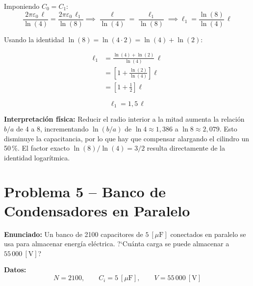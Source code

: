\documentclass[12pt,letterpaper]{article}
\begin{document}
Imponiendo $C_0 = C_1$:
\[
    \frac{2\pi\varepsilon_0\,\ell}{\ln(4)} = \frac{2\pi\varepsilon_0\,\ell_1}{\ln(8)}
    \implies
    \frac{\ell}{\ln(4)} = \frac{\ell_1}{\ln(8)}
    \implies
    \ell_1 = \frac{\ln(8)}{\ln(4)}\,\ell
\]

Usando la identidad $\ln(8) = \ln(4\cdot 2) = \ln(4) + \ln(2)$:

\begin{align*}
    \ell_1 &= \frac{\ln(4) + \ln(2)}{\ln(4)}\,\ell\\[6pt]
           &= \left[1 + \frac{\ln(2)}{\ln(4)}\right]\ell\\[6pt]
           &= \left[1 + \frac{1}{2}\right]\ell
\end{align*}

\[
    \boxed{\ell_1 = 1{,}5\,\ell}
\]

\noindent\textbf{Interpretaci\'on f\'isica:} Reducir el radio interior a la mitad aumenta la relaci\'on $b/a$ de 4 a 8, incrementando $\ln(b/a)$ de $\ln 4 \approx 1{,}386$ a $\ln 8 \approx 2{,}079$. Esto disminuye la capacitancia, por lo que hay que compensar alargando el cilindro un 50\,\%. El factor exacto $\ln(8)/\ln(4) = 3/2$ resulta directamente de la identidad logar\'itmica.

\newpage

\section*{Problema 5 -- Banco de Condensadores en Paralelo}

\noindent\textbf{Enunciado:} Un banco de 2100 capacitores de $5\ [\mu\text{F}]$ conectados en paralelo se usa para almacenar energ\'ia el\'ectrica. ?`Cu\'anta carga se puede almacenar a $55\,000\ [\text{V}]$?

\medskip
\noindent\textbf{Datos:}
\[
    N = 2100,\qquad C_i = 5\ [\mu\text{F}],\qquad V = 55\,000\ [\text{V}]
\]

\begin{center}
\end{center}
\end{document}
